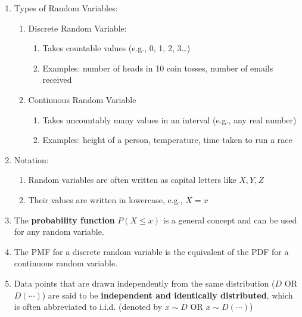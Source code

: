 \begin{enumerate}
    \item Types of Random Variables:
    \hfill \cite{common/online/chatgpt}
    \begin{enumerate}
        \item Discrete Random Variable:
        \hfill \cite{common/online/chatgpt}
        \begin{enumerate}
            \item Takes countable values (e.g., 0, 1, 2, 3…)
            \hfill \cite{common/online/chatgpt}

            \item Examples: number of heads in 10 coin tosses, number of emails received
            \hfill \cite{common/online/chatgpt}
        \end{enumerate}

        \item Continuous Random Variable
        \hfill \cite{common/online/chatgpt}
        \begin{enumerate}
            \item Takes uncountably many values in an interval (e.g., any real number)
            \hfill \cite{common/online/chatgpt}

            \item Examples: height of a person, temperature, time taken to run a race
            \hfill \cite{common/online/chatgpt}
        \end{enumerate}
    \end{enumerate}

    \item Notation:
    \begin{enumerate}
        \item Random variables are often written as capital letters like $X, Y, Z$
        \hfill \cite{common/online/chatgpt}

        \item Their values are written in lowercase, e.g., $X=x$
        \hfill \cite{common/online/chatgpt}
    \end{enumerate}

    \item The \textbf{probability function} $P(X \leq x)$ is a general concept and can be used for any random variable.
    \hfill \cite{statistics/book/Statistics-for-Data-Scientists/Maurits-Kaptein}

    \item The PMF for a discrete random variable is the equivalent of the PDF for a continuous random variable.
    \hfill \cite{statistics/book/Statistics-for-Data-Scientists/Maurits-Kaptein}

    \item Data points that are drawn independently from the same distribution ($D$ OR $D(\cdots)$) are said to be \textbf{independent and identically distributed}, which is often abbreviated to i.i.d. (denoted by $x \sim D$ OR $x \sim D(\cdots)$)
    \hfill \cite{ml/book/Pattern-Recognition-And-Machine-Learning/Christopher-M-Bishop}
\end{enumerate}





